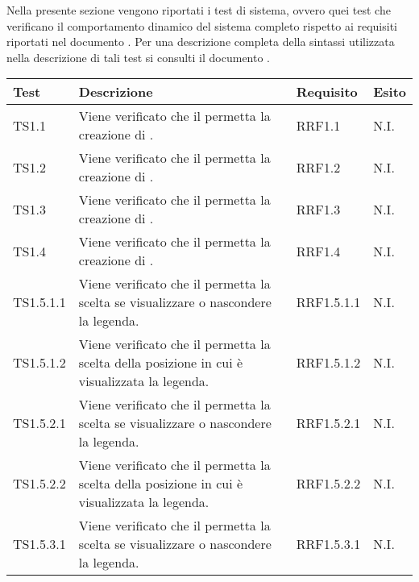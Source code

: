 Nella presente sezione vengono riportati i test di sistema, ovvero quei test che verificano il comportamento dinamico del sistema completo rispetto ai requisiti riportati nel documento . Per una descrizione completa della sintassi utilizzata nella descrizione di tali test si consulti il documento .


\begin{longtabu}{| X[0.5] | X | X[0.5] | X[0.4] |}

			\hline
			\rowfont{\bf}
			Test &
			Descrizione &
			Requisito &
			Esito \\
			\hline \endhead


TS1.1 & Viene verificato che il  permetta la creazione di . & RRF1.1 & N.I.\\ \hline

TS1.2 & Viene verificato che il  permetta la creazione di . & RRF1.2 & N.I.\\ \hline

TS1.3 & Viene verificato che il  permetta la creazione di . & RRF1.3 & N.I.\\ \hline

TS1.4 & Viene verificato che il  permetta la creazione di . & RRF1.4 & N.I.\\ \hline

TS1.5.1.1 & Viene verificato che il  permetta la scelta se visualizzare o nascondere la legenda. & RRF1.5.1.1 & N.I.\\ \hline

TS1.5.1.2 & Viene verificato che il  permetta la scelta della posizione in cui è visualizzata la legenda. & RRF1.5.1.2 & N.I.\\ \hline

TS1.5.2.1 & Viene verificato che il  permetta la scelta se visualizzare o nascondere la legenda. & RRF1.5.2.1 & N.I.\\ \hline

TS1.5.2.2 & Viene verificato che il  permetta la scelta della posizione in cui è visualizzata la legenda. & RRF1.5.2.2 & N.I.\\ \hline

TS1.5.3.1 & Viene verificato che il  permetta la scelta se visualizzare o nascondere la legenda. & RRF1.5.3.1 & N.I.\\ \hline


\end{longtabu}
